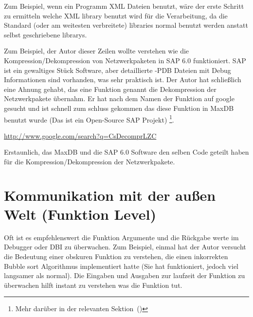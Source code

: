 Zum Beispiel, wenn ein Programm XML Dateien benutzt, w\"are der erste Schritt zu ermitteln welche
XML library benutzt wird f\"ur die Verarbeitung, da die Standard (oder am weitesten verbreitete) libraries
normal benutzt werden anstatt selbst geschriebene librarys.


Zum Beispiel, der Autor dieser Zeilen wollte verstehen wie die Kompression/Dekompression von Netzwerkpaketen in SAP 6.0 funktioniert.
SAP ist ein gewaltiges St\"uck Software, aber detaillierte -\gls{PDB} Dateien mit Debug Informationen sind vorhanden, was sehr praktisch 
ist. Der Autor hat schließlich eine Ahnung gehabt, das eine Funktion genannt  die Dekompression der Netzwerkpakete \"ubernahm.
Er hat nach dem Namen der Funktion auf google gesucht und ist schnell zum schluss gekommen das diese Funktion in 
MaxDB benutzt wurde (Das ist ein Open-Source SAP Projekt) \footnote{Mehr dar\"uber in der relevanten Sektion~()}. 

\url{http://www.google.com/search?q=CsDecomprLZC}

Erstaunlich, das MaxDB und die SAP 6.0 Software den selben Code geteilt haben f\"ur die Kompression/Dekompression der Netzwerkpakete.

 

\section{Kommunikation mit der außen Welt (Funktion Level)} 
Oft ist es empfehlenswert die Funktion Argumente und die R\"uckgabe werte im Debugger oder \ac{DBI} zu \"uberwachen.
Zum Beispiel, einmal hat der Autor versucht die Bedeutung einer obskuren Funktion zu verstehen, die einen inkorrekten
Bubble sort Algorithmus implementiert hatte (Sie hat funktioniert, jedoch viel langsamer als normal). Die Eingaben und Ausgaben zur laufzeit 
der Funktion zu \"uberwachen hilft instant zu verstehen was die Funktion tut.











